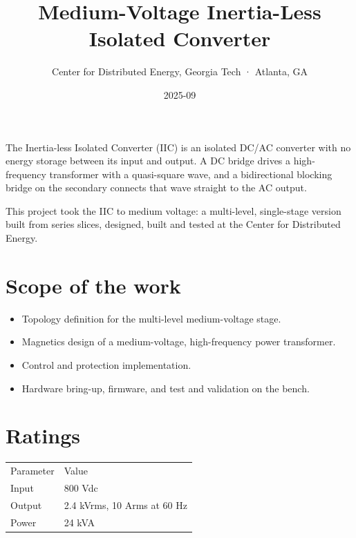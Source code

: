 \title{Medium-Voltage Inertia-Less Isolated Converter}
\subtitle{Center for Distributed Energy, Georgia Tech · Atlanta, GA}
\date{2025-09}




The Inertia-less Isolated Converter (IIC) is an isolated DC/AC converter with
no energy storage between its input and output. A DC bridge drives a
high-frequency transformer with a quasi-square wave, and a bidirectional
blocking bridge on the secondary connects that wave straight to the AC output.

This project took the IIC to medium voltage: a multi-level, single-stage
version built from series slices, designed, built and tested at the Center for
Distributed Energy.

\section{Scope of the work}

\begin{itemize}
  \item Topology definition for the multi-level medium-voltage stage.
  \item Magnetics design of a medium-voltage, high-frequency power transformer.
  \item Control and protection implementation.
  \item Hardware bring-up, firmware, and test and validation on the bench.
\end{itemize}

\section{Ratings}

\begin{tabular}{ll}
  Parameter & Value \\
  Input & 800 Vdc \\
  Output & 2.4 kVrms, 10 Arms at 60 Hz \\
  Power & 24 kVA \\
\end{tabular}


